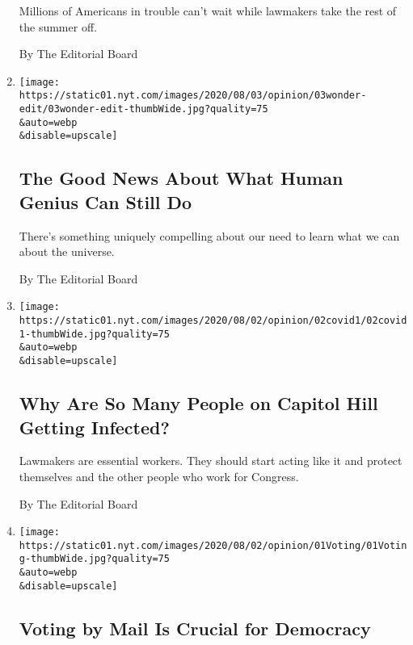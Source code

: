 \begin{enumerate}
  Millions of Americans in trouble can't wait while lawmakers take the
  rest of the summer off.

  By The Editorial Board
\item
  \href{/2020/08/03/opinion/spacex-stonehenge-mars.html}{}

  \texttt{[image: https://static01.nyt.com/images/2020/08/03/opinion/03wonder-edit/03wonder-edit-thumbWide.jpg?quality=75\\\&auto=webp\\\&disable=upscale]}

  \hypertarget{the-good-news-about-what-human-genius-can-still-do}{%
  \subsection{The Good News About What Human Genius Can Still
  Do}\label{the-good-news-about-what-human-genius-can-still-do}}

  There's something uniquely compelling about our need to learn what we
  can about the universe.

  By The Editorial Board
\item
  \href{/2020/08/02/opinion/coronavirus-gohmert-congress-testing.html}{}

  \texttt{[image: https://static01.nyt.com/images/2020/08/02/opinion/02covid1/02covid1-thumbWide.jpg?quality=75\\\&auto=webp\\\&disable=upscale]}

  \hypertarget{why-are-so-many-people-on-capitol-hill-getting-infected}{%
  \subsection{Why Are So Many People on Capitol Hill Getting
  Infected?}\label{why-are-so-many-people-on-capitol-hill-getting-infected}}

  Lawmakers are essential workers. They should start acting like it and
  protect themselves and the other people who work for Congress.

  By The Editorial Board
\item
  \href{/2020/08/01/opinion/sunday/mail-voting-covid-2020-election.html}{}

  \texttt{[image: https://static01.nyt.com/images/2020/08/02/opinion/01Voting/01Voting-thumbWide.jpg?quality=75\\\&auto=webp\\\&disable=upscale]}

  \hypertarget{voting-by-mail-is-crucial-for-democracy}{%
  \subsection{Voting by Mail Is Crucial for
  Democracy}\label{voting-by-mail-is-crucial-for-democracy}}


\end{enumerate}
